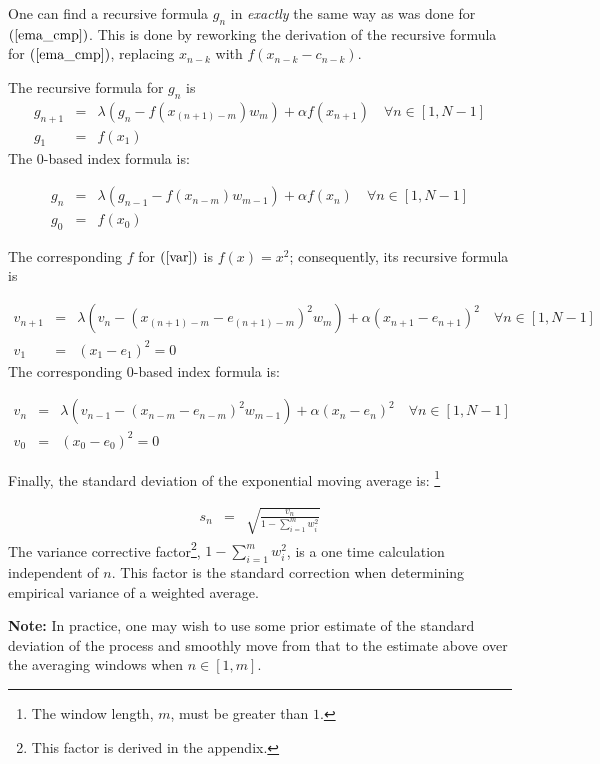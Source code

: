 \documentclass{article}
\begin{document}
One can find a recursive formula $g_n$ in {\em exactly\/} the same way as
was done for $(\ref{ema_cmp})$. This is done by reworking the derivation of 
the recursive formula for $(\ref{ema_cmp})$, replacing $x_{n-k}$ with $f(x_{n-k} - c_{n-k})$.

The recursive formula for $g_n$ is
\begin{eqnarray}
    g_{n+1} &=&  \lambda \left( g_{n} - f(x_{(n+1)-m}) w_m \right) + \alpha f(x_{n+1})   \quad \forall n \in [1, N-1] \\
    g_1     &=&  f(x_1) 
\end{eqnarray}
The 0-based index formula is:

\begin{eqnarray}
    g_{n} &=&  \lambda \left( g_{n-1} - f(x_{n-m}) w_{m-1} \right) + \alpha f(x_{n}) \quad \forall n \in [1, N-1] \\
    g_0   &=&  f(x_0) 
\end{eqnarray}


The corresponding $f$ for $(\ref{var})$ is $f(x) = x^2$; 
consequently, its recursive formula is 

\begin{eqnarray}
    v_{n+1} &=& \lambda \left( v_n -  ( x_{(n+1)-m} - e_{(n+1)-m} )^2 w_m \right) + \alpha( x_{n+1} - e_{n+1} )^2 \quad \forall n \in [1, N-1] \\
    v_1     &=&  (x_1 - e_1)^2 = 0 
\end{eqnarray}
The corresponding 0-based index formula is:

\begin{eqnarray}
    v_{n} &=& \lambda \left( v_{n-1} - ( x_{n-m} - e_{n-m} )^2 w_{m-1}\right) + \alpha ( x_{n} - e_{n} )^2 \quad \forall n \in [1, N-1] \\
    v_0   &=& (x_0 - e_0)^2 = 0 
\end{eqnarray}

Finally, the standard deviation of the exponential moving average is:%
\footnote{The window length, $m$, must be greater than $1$.}

\begin{eqnarray}
    s_{n} &=& \sqrt{\frac{v_n}{1 - \sum_{i=1}^m w_i^2}}  
\end{eqnarray}
The variance corrective factor\footnote{This factor is derived in the appendix.}, $1 - \sum_{i=1}^m w_i^2$,
is a one time calculation independent of $n$. This factor is the standard 
correction when determining empirical variance of a weighted average.

{\bf Note:\/} In practice, one may wish to use some prior estimate of the standard deviation of the process
and smoothly move from that to the estimate above over the averaging windows when $n \in [1, m]$.
\end{document}
